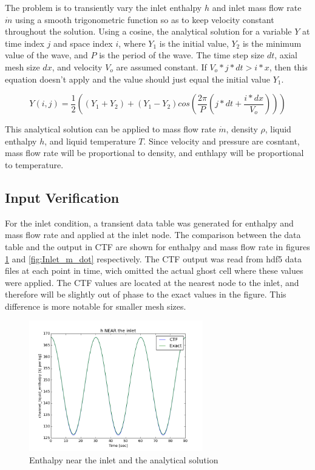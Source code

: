 \documentclass{mc2015}
\begin{document}
The problem is to transiently vary the inlet enthalpy $h$ and inlet mass flow
rate $\dot{m}$ using a smooth trigonometric function so as to keep velocity
constant throughout the solution. Using a cosine, the analytical solution for a
variable $Y$ at time index $j$ and space index $i$, where $Y_{1}$ is the initial
value, $Y_{2}$ is the minimum value of the wave, and $P$ is the period of the
wave. The time step size $dt$, axial mesh size $dx$, and velocity $V_{o}$ are
assumed constant. If $V_{o}*j*dt>i*x$, then this equation doesn't apply and the
value should just equal the initial value $Y_{1}$.

\begin{equation}
	Y(i,j) = \frac{1}{2} \left( 
			(Y_{1}+Y_{2}) + (Y_{1}-Y_{2}) cos\left(
				\frac{2 \pi}{P} \left( j*dt + \frac{i*dx}{V_{o}} \right)
				\right)
			\right)
\end{equation}

This analytical solution can be applied to mass flow rate $\dot{m}$,
density $\rho$, liquid enthalpy $h$, and liquid temperature $T$. Since velocity
and pressure are cosntant, mass flow rate will be proportional to density, and
enthlapy will be proportional to temperature.

\subsection{Input Verification}

For the inlet condition, a transient data table was generated for enthalpy and
mass flow rate and applied at the inlet node. The comparison between the data
table and the output in CTF are shown for enthalpy and mass flow rate in figures
\ref{fig:Inlet_h} and \ref{fig:Inlet_m_dot} respectively. The CTF output was
read from hdf5 data files at each point in time, wich omitted the actual ghost
cell where these values were applied. The CTF values are located at the nearest
node to the inlet, and therefore will be slightly out of phase to the exact
values in the figure. This difference is more notable for smaller mesh sizes.

\begin{figure}[!h]
	\centering
	\includegraphics[width=0.675\textwidth]{images/Inlet_h}
	\caption{Enthalpy near the inlet and the analytical solution}
	\label{fig:Inlet_h}
\end{figure}
\end{document}

